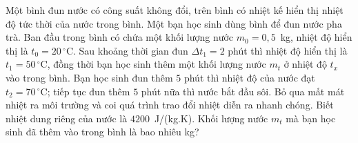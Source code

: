 	\begin{ex}%
		Một bình đun nước có công suất không đổi, trên bình có nhiệt kế hiển thị nhiệt độ tức thời của nước trong bình. Một bạn học sinh dùng bình để đun nước pha trà. Ban đầu trong bình có chứa một khối lượng nước $m_0=0{,}5$~kg, nhiệt độ hiển thị là $t_0=20\,^\circ\text{C}$. Sau khoảng thời gian đun $\Delta t_1=2$ phút thì nhiệt độ hiển thị là $t_1=50\,^\circ\text{C}$, đồng thời bạn học sinh thêm một khối lượng nước $m_t$ ở nhiệt độ $t_x$ vào trong bình. Bạn học sinh đun thêm $5$ phút thì nhiệt độ của nước đạt $t_2=70\,^\circ\text{C}$; tiếp tục đun thêm $5$ phút nữa thì nước bắt đầu sôi. Bỏ qua mất mát nhiệt ra môi trường và coi quá trình trao đổi nhiệt diễn ra nhanh chóng. Biết nhiệt dung riêng của nước là $4200$~J/(kg.K). Khối lượng nước $m_t$ mà bạn học sinh đã thêm vào trong bình là bao nhiêu kg?
		\par
	\end{ex}

